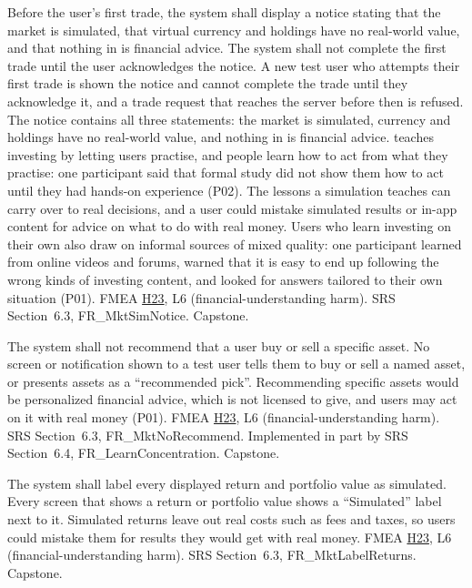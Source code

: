 \documentclass{article}
\newcommand{\hazref}[1]{\hyperref[#1]{#1}}
\begin{document}
\begin{description}

{Before the user's first trade, the system shall display a notice stating that
the market is simulated, that virtual currency and holdings have no real-world
value, and that nothing in \progname{} is financial advice. The system shall
not complete the first trade until the user acknowledges the notice.}
{A new test user who attempts their first trade is shown the notice and cannot
complete the trade until they acknowledge it, and a trade request that reaches
the server before then is refused. The notice contains all three statements: the market is simulated, currency and holdings have no real-world
value, and nothing in \progname{} is financial advice.}
{\progname{} teaches investing by letting users practise, and people learn how
to act from what they practise: one participant said that formal study did not
show them how to act until they had hands-on experience (P02). The lessons a
simulation teaches can carry over to real decisions, and a user could
mistake simulated results or in-app content for advice on what to do with real
money. Users who learn investing on their own also draw on informal sources of
mixed quality: one participant learned from online videos and forums, warned
that it is easy to end up following the wrong kinds of investing content, and
looked for answers tailored to their own situation (P01).}
{FMEA \hazref{H23}, L6 (financial-understanding harm).}
{SRS Section~6.3, FR\_MktSimNotice.}
{Capstone.}

{The system shall not recommend that a user buy or sell a specific asset.}
{No screen or notification shown to a test user tells them to buy or sell a
named asset, or presents assets as a ``recommended pick''.}
{Recommending specific assets would be personalized financial advice, which
\progname{} is not licensed to give, and users may act on it with real money
(P01).}
{FMEA \hazref{H23}, L6 (financial-understanding harm).}
{SRS Section~6.3, FR\_MktNoRecommend. Implemented in part by SRS
Section~6.4, FR\_LearnConcentration.}
{Capstone.}

{The system shall label every displayed return and portfolio value as
simulated.}
{Every screen that shows a return or portfolio value shows a ``Simulated''
label next to it.}
{Simulated returns leave out real costs such as fees and taxes, so users could
mistake them for results they would get with real money.}
{FMEA \hazref{H23}, L6 (financial-understanding harm).}
{SRS Section~6.3, FR\_MktLabelReturns.}
{Capstone.}



\end{description}
\end{document}

